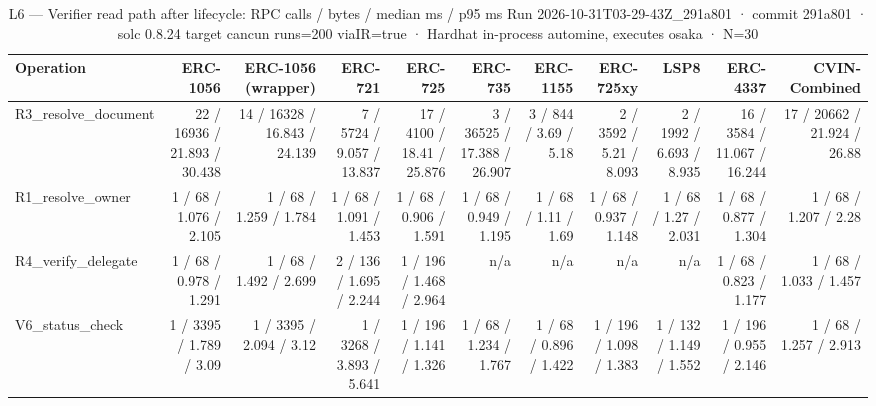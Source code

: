\begin{table}[ht]
\centering
\small
\begin{tabular}{lrrrrrrrrrr}
\toprule
Operation & ERC-1056 & ERC-1056 (wrapper) & ERC-721 & ERC-725 & ERC-735 & ERC-1155 & ERC-725xy & LSP8 & ERC-4337 & CVIN-Combined \\
\midrule
R3\_resolve\_document & 22 / 16936 / 21.893 / 30.438 & 14 / 16328 / 16.843 / 24.139 & 7 / 5724 / 9.057 / 13.837 & 17 / 4100 / 18.41 / 25.876 & 3 / 36525 / 17.388 / 26.907 & 3 / 844 / 3.69 / 5.18 & 2 / 3592 / 5.21 / 8.093 & 2 / 1992 / 6.693 / 8.935 & 16 / 3584 / 11.067 / 16.244 & 17 / 20662 / 21.924 / 26.88 \\
R1\_resolve\_owner & 1 / 68 / 1.076 / 2.105 & 1 / 68 / 1.259 / 1.784 & 1 / 68 / 1.091 / 1.453 & 1 / 68 / 0.906 / 1.591 & 1 / 68 / 0.949 / 1.195 & 1 / 68 / 1.11 / 1.69 & 1 / 68 / 0.937 / 1.148 & 1 / 68 / 1.27 / 2.031 & 1 / 68 / 0.877 / 1.304 & 1 / 68 / 1.207 / 2.28 \\
R4\_verify\_delegate & 1 / 68 / 0.978 / 1.291 & 1 / 68 / 1.492 / 2.699 & 2 / 136 / 1.695 / 2.244 & 1 / 196 / 1.468 / 2.964 & n/a & n/a & n/a & n/a & 1 / 68 / 0.823 / 1.177 & 1 / 68 / 1.033 / 1.457 \\
V6\_status\_check & 1 / 3395 / 1.789 / 3.09 & 1 / 3395 / 2.094 / 3.12 & 1 / 3268 / 3.893 / 5.641 & 1 / 196 / 1.141 / 1.326 & 1 / 68 / 1.234 / 1.767 & 1 / 68 / 0.896 / 1.422 & 1 / 196 / 1.098 / 1.383 & 1 / 132 / 1.149 / 1.552 & 1 / 196 / 0.955 / 2.146 & 1 / 68 / 1.257 / 2.913 \\
\bottomrule
\end{tabular}
\caption{L6 — Verifier read path after lifecycle: RPC calls / bytes / median ms / p95 ms Run 2026-10-31T03-29-43Z\_291a801 · commit 291a801 · solc 0.8.24 target cancun runs=200 viaIR=true · Hardhat in-process automine, executes osaka · N=30}
\label{tab:resolve}
\end{table}

